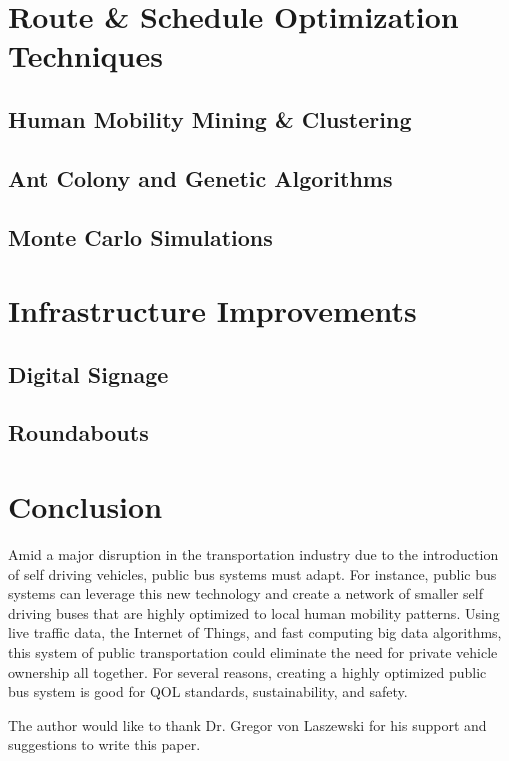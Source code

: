\documentclass[sigconf]{acmart}
\begin{document}
\section{Route \& Schedule Optimization Techniques}
\subsection{Human Mobility Mining \& Clustering}
\subsection{Ant Colony and Genetic Algorithms}
\subsection{Monte Carlo Simulations}

\section{Infrastructure Improvements}
\subsection{Digital Signage}
\subsection{Roundabouts}

\section{Conclusion}

Amid a major disruption in the transportation industry due to the introduction of self driving vehicles, public bus systems must adapt. For instance, public bus systems can leverage this new technology and create a network of smaller self driving buses that are highly optimized to local human mobility patterns. Using live traffic data, the Internet of Things, and fast computing big data algorithms, this system of public transportation could eliminate the need for private vehicle ownership all together. For several reasons, creating a highly optimized public bus system is good for QOL standards, sustainability, and safety. 

\begin{acks}

The author would like to thank Dr. Gregor von Laszewski for his support and suggestions to write this paper.

\end{acks}


 
\end{document}
